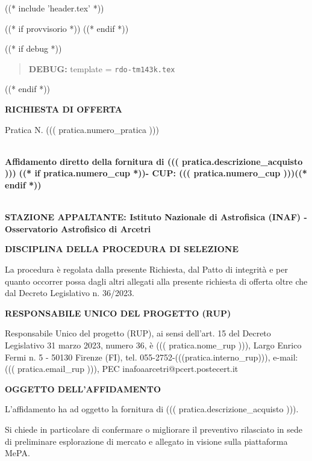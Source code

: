
((* include 'header.tex' *))

((* if provvisorio *))
((* endif *))



\topaddr

((* if debug *))
\begin{quotation}
	\textbf{DEBUG:} template = \texttt{rdo-tm143k.tex}
\end{quotation}
((* endif *))

\begin{center}
\textbf{RICHIESTA DI OFFERTA}
\end{center}

Pratica N. ((( pratica.numero_pratica )))


~\\
\textbf{Affidamento diretto della fornitura di ((( pratica.descrizione_acquisto )))}
\textbf{((* if pratica.numero_cup *))- CUP: ((( pratica.numero_cup )))((* endif *))}


~\\
\textbf{STAZIONE APPALTANTE: Istituto Nazionale di Astrofisica (INAF) - Osservatorio Astrofisico di Arcetri}

\textbf{DISCIPLINA DELLA PROCEDURA DI SELEZIONE}

La procedura è regolata dalla presente Richiesta, dal Patto di integrità
e per quanto occorrer possa dagli altri allegati alla presente richiesta
di offerta oltre che dal Decreto Legislativo n. 36/2023.


\textbf{RESPONSABILE UNICO DEL PROGETTO (RUP)}

Responsabile Unico del progetto (RUP), ai sensi dell'art. 15 del
Decreto Legislativo 31 marzo 2023, numero 36, è
 ((( pratica.nome_rup ))), Largo Enrico Fermi n. 5 - 50130 Firenze
 (FI), tel. 055-2752-(((pratica.interno_rup))),
e-mail: ((( pratica.email_rup ))), PEC inafoaarcetri@pcert.postecert.it


\textbf{OGGETTO DELL'AFFIDAMENTO}

L'affidamento ha ad oggetto la fornitura di  ((( pratica.descrizione_acquisto ))).

Si chiede in particolare di confermare o migliorare il preventivo
rilasciato in sede di preliminare esplorazione di mercato e allegato in
visione sulla piattaforma MePA.

